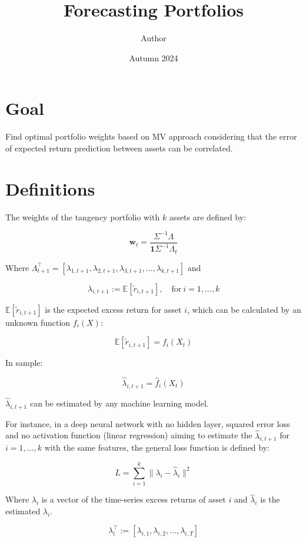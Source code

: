 \documentclass{article}
\title{Forecasting Portfolios}
\author{Author}
\date{Autumn 2024}
\begin{document}
\maketitle

\section{Goal}

Find optimal portfolio weights based on MV approach considering that the error of expected return prediction between assets can be correlated.

\section{Definitions}

The weights of the tangency portfolio with $k$ assets are defined by:

$$
\textbf{w}_t = \dfrac{\Sigma^{-1} \Lambda}{\textbf{1} \Sigma^{-1} \Lambda_t}
$$

Where $\Lambda_{t+1}^{\top} = \left[  \lambda_{1, t+1}, \lambda_{2, t+1}, \lambda_{3, t+1}, \ldots, \lambda_{k, t+1} \right]$ and

$$
\lambda_{i, t+1} := \mathbb{E}[\tilde{r}_{i, t+1}], \quad \text{for} \ i = 1, \ldots, k
$$

$\mathbb{E}[\tilde{r}_{i, t+1}]$ is the expected excess return for asset $i$, which can be calculated by an unknown function $f_i(X)$:

$$
\mathbb{E}[\tilde{r}_{i, t+1}] = f_i(X_t)
$$

In sample:

$$
\hat{\lambda}_{i, t+1} = \hat{f}_i(X_t)
$$

$\hat{\lambda}_{i, t+1}$ can be estimated by any machine learning model.

For instance, in a deep neural network with no hidden layer, squared error loss and no activation function (linear regression) aiming to estimate the $\hat{\lambda}_{i, t+1}$ for $i = 1, \ldots, k$ with the same features, the general loss function is defined by:

$$
L = \sum_{i = 1}^{k} \lVert \lambda_i - \hat{\lambda}_i \rVert^2
$$

Where $\lambda_i$ is a vector of the time-series excess returns of asset $i$ and $\hat{\lambda}_i$ is the estimated $\lambda_i$.

$$
\lambda_i^{\top} := \left[ \lambda_{i, 1}, \lambda_{i, 2}, \ldots, \lambda_{i, T} \right]
$$
\end{document}
